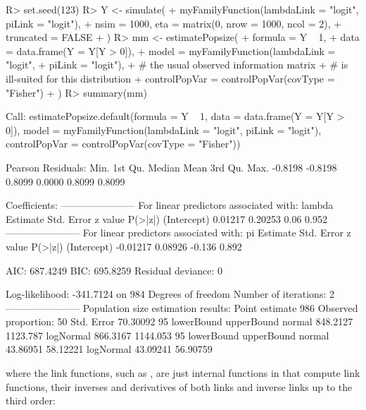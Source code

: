 \documentclass[
]{jss}
\newcommand{\1}{\mathcal{I}} \newcommand{\bZero}{\boldsymbol{0}}
\begin{document}
\begin{CodeChunk}
\begin{CodeInput}
R> set.seed(123)
R> Y <- simulate(
+     myFamilyFunction(lambdaLink = "logit", piLink = "logit"),
+     nsim = 1000, eta = matrix(0, nrow = 1000, ncol = 2),
+     truncated = FALSE
+ )
R> mm <- estimatePopsize(
+     formula = Y ~ 1,
+     data = data.frame(Y = Y[Y > 0]),
+     model = myFamilyFunction(lambdaLink = "logit", 
+                              piLink = "logit"),
+     # the usual observed information matrix 
+     # is ill-suited for this distribution
+     controlPopVar = controlPopVar(covType = "Fisher")
+ )
R> summary(mm)
\end{CodeInput}
\begin{CodeOutput}

Call:
estimatePopsize.default(formula = Y ~ 1, data = data.frame(Y = Y[Y > 
    0]), model = myFamilyFunction(lambdaLink = "logit", piLink = "logit"), 
    controlPopVar = controlPopVar(covType = "Fisher"))

Pearson Residuals:
   Min. 1st Qu.  Median    Mean 3rd Qu.    Max. 
-0.8198 -0.8198  0.8099  0.0000  0.8099  0.8099 

Coefficients:
-----------------------
For linear predictors associated with: lambda 
            Estimate Std. Error z value P(>|z|)
(Intercept)  0.01217    0.20253    0.06   0.952
-----------------------
For linear predictors associated with: pi 
            Estimate Std. Error z value P(>|z|)
(Intercept) -0.01217    0.08926  -0.136   0.892

AIC: 687.4249
BIC: 695.8259
Residual deviance: 0

Log-likelihood: -341.7124 on 984 Degrees of freedom 
Number of iterations: 2
-----------------------
Population size estimation results: 
Point estimate 986
Observed proportion: 50%
Std. Error 70.30092
95%
          lowerBound upperBound
normal      848.2127   1123.787
logNormal   866.3167   1144.053
95%
          lowerBound upperBound
normal      43.86951   58.12221
logNormal   43.09241   56.90759
\end{CodeOutput}
\end{CodeChunk}

where the link functions, such as
, are just internal
functions in  that compute link functions, their
inverses and derivatives of both links and inverse links up to the third
order: \small
\end{document}
